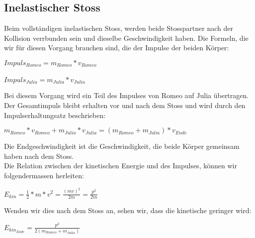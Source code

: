 \documentclass[../main.tex]{subfiles}
\begin{document}
\subsection{Inelastischer Stoss}
Beim vollständigen inelastischen Stoss, werden beide Stosspartner nach der Kollision verrbunden sein und dieselbe Geschwindigkeit haben\cite{tiplerpaula.PhysikFurStudierende}. Die Formeln, die wir für diesen Vorgang brauchen sind, die der Impulse der beiden Körper:
\begin{mdframed}
$Impuls_{Romeo} = m_{Romeo}*v_{Romeo}$\\\\
$Impuls_{Julia} = m_{Julia}*v_{Julia}$
\end{mdframed}
 Bei diesem Vorgang wird ein Teil des Impulses von Romeo auf Julia übertragen. Der Gesamtimpuls bleibt erhalten vor und nach dem Stoss und wird durch den Impulserhaltungsatz beschrieben\cite{tiplerpaula.PhysikFurStudierende}:
\begin{mdframed}
$ m_{Romeo}*v_{Romeo} +  m_{Julia}*v_{Julia} = (m_{Romeo} + m_{Julia})*v_{Ende}$
\end{mdframed}
Die Endgeschwindigkeit ist die Geschwindigkeit, die beide Körper gemeinsam haben nach dem Stoss.\\
Die Relation zwischen der kinetischen Energie und des Impulses, können wir folgendermassen herleiten\cite{tiplerpaula.PhysikFurStudierende}:
\begin{mdframed}
$E_{kin}=\frac{1}{2} * m * v^{2} = \frac{(mv)^{2}}{2m} = \frac{p^{2}}{2m}$
\end{mdframed}
Wenden wir dies nach dem Stoss an, sehen wir, dass die kinetische geringer wird:
\begin{mdframed}
$E_{kin_{Ende}}=\frac{p^{2}}{2(m_{Romeo} + m_{Julia})} $
\end{mdframed}
\end{document}
